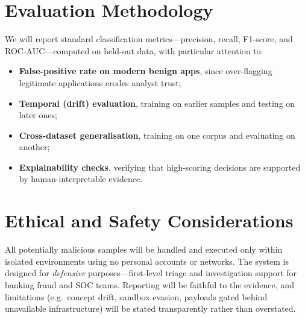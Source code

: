 \documentclass[11pt,a4paper]{article}
\begin{document}
\section{Evaluation Methodology}
We will report standard classification metrics---precision, recall, F1-score, and
ROC-AUC---computed on held-out data, with particular attention to:
\begin{itemize}
  \item \textbf{False-positive rate on modern benign apps}, since over-flagging
  legitimate applications erodes analyst trust;
  \item \textbf{Temporal (drift) evaluation}, training on earlier samples and testing on
  later ones;
  \item \textbf{Cross-dataset generalisation}, training on one corpus and evaluating on
  another;
  \item \textbf{Explainability checks}, verifying that high-scoring decisions are
  supported by human-interpretable evidence.
\end{itemize}

\section{Ethical and Safety Considerations}
All potentially malicious samples will be handled and executed only within isolated
environments using no personal accounts or networks. The system is designed for
\emph{defensive} purposes---first-level triage and investigation support for banking
fraud and SOC teams. Reporting will be faithful to the evidence, and limitations
(e.g.\ concept drift, sandbox evasion, payloads gated behind unavailable infrastructure)
will be stated transparently rather than overstated.
\end{document}
